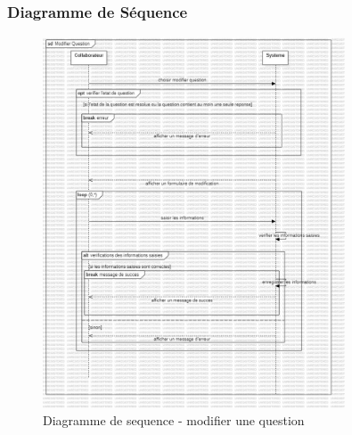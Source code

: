 \documentclass{article}
\begin{document}
            \subsubsection{Diagramme de Séquence}
            \begin{figure}[h!]
                \centering
                \includegraphics[width=0.8\textwidth]{assets/diagrammes/sequenceDiagram.jpg}
                \caption{Diagramme de sequence - modifier une question}
            \end{figure}
            \FloatBarrier
            \newpage
\end{document}
